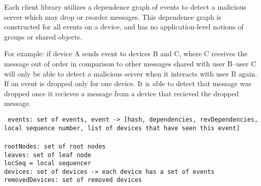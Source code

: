 
Each client library utilizes a dependence graph of events to detect a malicious server which may drop or reorder messages. This dependence graph is constructed for all events on a device, and has no application-level notions of groups or shared objects.

For example: if device A sends event to devices B and C, where C receives the message out of order in comparison to other messages shared with user B--user C will only be able to detect a malicious server when it interacts with user B again. If an event is dropped only for one device. It is able to detect that message was dropped once it recieves a message from a device that recieved the dropped message. 





\texttt{ 
    events: set of events, event -> [hash, dependencies, revDependencies, local sequence number, list of devices that have seen this event] \\ \\
    rootNodes: set of root nodes \\
    leaves: set of leaf node \\
    locSeq = local sequencer \\
    devices: set of devices -> each device has a set of events \\
    removedDevices: set of removed devices
}

